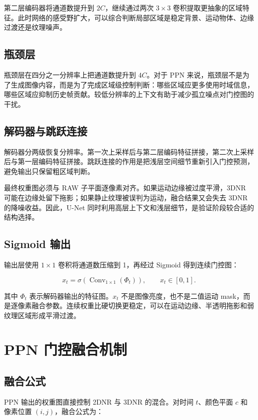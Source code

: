 \documentclass[UTF8,zihao=-4]{ctexart}
\begin{document}
第二层编码器将通道数提升到 $2C$，继续通过两次 $3\times3$ 卷积提取更抽象的区域特征。此时网络的感受野扩大，可以综合判断局部区域是稳定背景、运动物体、边缘过渡还是纹理噪声。

\subsection{瓶颈层}

瓶颈层在四分之一分辨率上把通道数提升到 $4C$。对于 PPN 来说，瓶颈层不是为了生成图像内容，而是为了完成区域级控制判断：哪些区域应更多使用时域信息，哪些区域应抑制历史帧贡献。较低分辨率的上下文有助于减少孤立噪点对门控图的干扰。

\subsection{解码器与跳跃连接}

解码器分两级恢复分辨率。第一次上采样后与第二层编码特征拼接，第二次上采样后与第一层编码特征拼接。跳跃连接的作用是把浅层空间细节重新引入门控预测，避免输出只保留粗区域判断。

最终权重图必须与 RAW 子平面逐像素对齐。如果运动边缘被过度平滑，3DNR 可能在边缘处留下拖影；如果静止纹理被误判为运动，融合结果又会失去 3DNR 的降噪收益。因此，U-Net 同时利用高层上下文和浅层细节，是验证阶段较合适的结构选择。

\subsection{Sigmoid 输出}

输出层使用 $1\times1$ 卷积将通道数压缩到 1，再经过 Sigmoid 得到连续门控图：

\[
x_t=\sigma\left(\operatorname{Conv}_{1\times1}(\Phi_t)\right),
\qquad x_t\in[0,1].
\]

其中 $\Phi_t$ 表示解码器输出的特征图。$x_t$ 不是图像亮度，也不是二值运动 mask，而是逐像素融合参数。连续权重比硬切换更稳定，可以在运动边缘、半透明拖影和弱纹理区域形成平滑过渡。

\section{PPN 门控融合机制}

\subsection{融合公式}

PPN 输出的权重图直接控制 2DNR 与 3DNR 的混合。对时间 $t$、颜色平面 $c$ 和像素位置 $(i,j)$，融合公式为：
\end{document}
